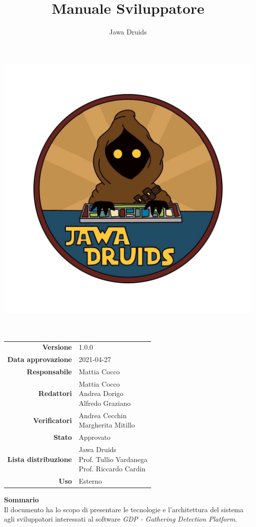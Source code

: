 



\makeatletter
\begin{titlepage}
	\begin{center}
		\vspace*{-4cm}
		\author{Jawa Druids}
		\title{Manuale Sviluppatore}
		\date{} %
		\includegraphics[width=0.5\linewidth]{../immagini/DRUIDSLOGO.jpg}\\[4ex]
		{\huge \bfseries  \@title }\\[2ex]
		{\LARGE  \@author}\\[50ex]
		\vspace*{-9cm}
		\begin{table}[H]
			\renewcommand{\arraystretch}{1.4}
			\centering
			\begin{tabular}{r | l}
				\textbf{Versione} & 1.0.0 \\%
				\textbf{Data approvazione} & 2021-04-27 \\
				\textbf{Responsabile} & Mattia Cocco \\
				\textbf{Redattori} & \makecell[tl]{Mattia Cocco \\ Andrea Dorigo \\ Alfredo Graziano} \\
				\textbf{Verificatori} & \makecell[tl]{Andrea Cecchin \\ Margherita Mitillo} \\
				\textbf{Stato} & Approvato\\
				\textbf{Lista distribuzione} & \makecell[tl]{Jawa Druids \\ Prof. Tullio Vardanega \\ Prof. Riccardo Cardin}\\
				\textbf{Uso} & Esterno
			\end{tabular}
		\end{table}
		\vspace{0.1cm}
		\hfill \break
		\fontsize{17}{10}\textbf{Sommario} \\
		\vspace{0.1cm}
		Il documento ha lo scopo di presentare le tecnologie e l'architettura del sistema agli sviluppatori interessati al software \emph{\normalsize{\textit{GDP - Gathering Detection Platform}}}.
	\end{center}
\end{titlepage}
\makeatother
	

